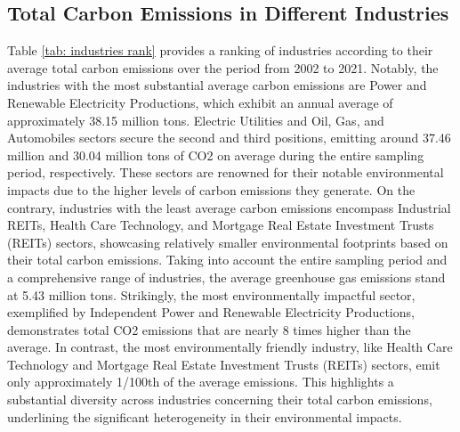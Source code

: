 \documentclass[12pt]{article}
\begin{document}
\subsection{Total Carbon Emissions in Different Industries}

Table \ref{tab: industries rank} provides a ranking of industries according to their average total carbon emissions over the period from 2002 to 2021. Notably, the industries with the most substantial average carbon emissions are Power and Renewable Electricity Productions, which exhibit an annual average of approximately 38.15 million tons. Electric Utilities and Oil, Gas, and Automobiles sectors secure the second and third positions, emitting around 37.46 million and 30.04 million tons of CO2 on average during the entire sampling period, respectively. These sectors are renowned for their notable environmental impacts due to the higher levels of carbon emissions they generate. On the contrary, industries with the least average carbon emissions encompass Industrial REITs, Health Care Technology, and Mortgage Real Estate Investment Trusts (REITs) sectors, showcasing relatively smaller environmental footprints based on their total carbon emissions. Taking into account the entire sampling period and a comprehensive range of industries, the average greenhouse gas emissions stand at 5.43 million tons. Strikingly, the most environmentally impactful sector, exemplified by Independent Power and Renewable Electricity Productions, demonstrates total CO2 emissions that are nearly 8 times higher than the average. In contrast, the most environmentally friendly industry, like Health Care Technology and Mortgage Real Estate Investment Trusts (REITs) sectors, emit only approximately 1/100th of the average emissions. This highlights a substantial diversity across industries concerning their total carbon emissions, underlining the significant heterogeneity in their environmental impacts.
\end{document}
